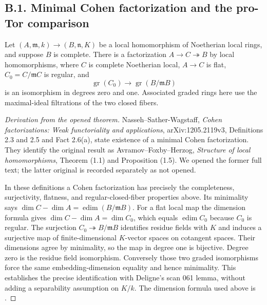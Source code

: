 \subsection{B.1. Minimal Cohen factorization and the pro-Tor comparison}

\begin{theorem}\label{SA23-B1-1}
Let $(A,\mathfrak m,k)\to(B,\mathfrak n,K)$ be a local homomorphism
of Noetherian local rings, and suppose $B$ is complete.  There is a
factorization $A\to C\twoheadrightarrow B$ by local homomorphisms,
where $C$ is complete Noetherian local, $A\to C$ is flat, $C_0=C/\mathfrak mC$
is regular, and
\[
 \operatorname{gr}(C_0)\longrightarrow\operatorname{gr}(B/\mathfrak mB)
\]
is an isomorphism in degrees zero and one.  Associated graded rings
here use the maximal-ideal filtrations of the two closed fibers.
\end{theorem}
\begin{proof}[Derivation from the opened theorem]
Nasseh--Sather-Wagstaff, \emph{Cohen factorizations: Weak functoriality
and applications}, arXiv:1205.2119v3, Definitions 2.3 and 2.5 and
Fact 2.6(a), state existence of a minimal Cohen factorization.
\cite[Definitions 2.3, 2.5 and Fact 2.6(a)]{algNassehSatherWagstaff2015}
They identify the original result as Avramov--Foxby--Herzog,
\emph{Structure of local homomorphisms}, Theorem (1.1) and
Proposition (1.5).  We opened the former full text; the latter original
is recorded separately as not opened.
\cite{algAvramovFoxbyHerzog1994}

In these definitions a Cohen factorization has precisely the
completeness, surjectivity, flatness, and regular-closed-fiber properties
above.  Its minimality says
$\dim C-\dim A=\operatorname{edim}(B/\mathfrak mB)$.
For a flat local map the dimension formula gives
$\dim C-\dim A=\dim C_0$, which equals
$\operatorname{edim}C_0$ because $C_0$ is regular.  The surjection
$C_0\twoheadrightarrow B/\mathfrak mB$ identifies residue fields with
$K$ and induces a surjective map of finite-dimensional $K$-vector
spaces on cotangent spaces.  Their dimensions agree by minimality,
so the map in degree one is bijective.  Degree zero is the residue
field isomorphism.  Conversely those two graded isomorphisms force
the same embedding-dimension equality and hence minimality.  This
establishes the precise identification with Deligne's scan 061 lemma,
without adding a separability assumption on $K/k$.
The dimension formula used above is
\cite[Lemma 10.112.7]{algStacksDimension}.
\end{proof}

